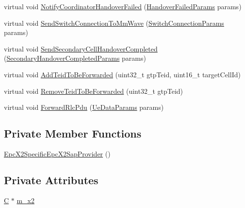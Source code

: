\begin{DoxyCompactItemize}
\item 
virtual void \hyperlink{classns3_1_1EpcX2SpecificEpcX2SapProvider_a8a75fce81f1207ec1c2d5b635e46215f}{Notify\+Coordinator\+Handover\+Failed} (\hyperlink{structns3_1_1EpcX2Sap_1_1HandoverFailedParams}{Handover\+Failed\+Params} params)
\item 
virtual void \hyperlink{classns3_1_1EpcX2SpecificEpcX2SapProvider_a4683ffd184c6dba1dc7fd2a569949380}{Send\+Switch\+Connection\+To\+Mm\+Wave} (\hyperlink{structns3_1_1EpcX2Sap_1_1SwitchConnectionParams}{Switch\+Connection\+Params} params)
\item 
virtual void \hyperlink{classns3_1_1EpcX2SpecificEpcX2SapProvider_af1b1a3d3956bb801d3739a038ce72808}{Send\+Secondary\+Cell\+Handover\+Completed} (\hyperlink{structns3_1_1EpcX2Sap_1_1SecondaryHandoverCompletedParams}{Secondary\+Handover\+Completed\+Params} params)
\item 
virtual void \hyperlink{classns3_1_1EpcX2SpecificEpcX2SapProvider_aa198a2f4b85a37e6fd8cab04d80ed75a}{Add\+Teid\+To\+Be\+Forwarded} (uint32\+\_\+t gtp\+Teid, uint16\+\_\+t target\+Cell\+Id)
\item 
virtual void \hyperlink{classns3_1_1EpcX2SpecificEpcX2SapProvider_a99a850bb0e7ef9df7ccfa757621ba77e}{Remove\+Teid\+To\+Be\+Forwarded} (uint32\+\_\+t gtp\+Teid)
\item 
virtual void \hyperlink{classns3_1_1EpcX2SpecificEpcX2SapProvider_a06c749ab5201e30f839f32014ae3e936}{Forward\+Rlc\+Pdu} (\hyperlink{structns3_1_1EpcX2Sap_1_1UeDataParams}{Ue\+Data\+Params} params)
\end{DoxyCompactItemize}
\subsection*{Private Member Functions}
\begin{DoxyCompactItemize}
\item 
\hyperlink{classns3_1_1EpcX2SpecificEpcX2SapProvider_a6a13ad96b39b151b4a13367c4db44463}{Epc\+X2\+Specific\+Epc\+X2\+Sap\+Provider} ()
\end{DoxyCompactItemize}
\subsection*{Private Attributes}
\begin{DoxyCompactItemize}
\item 
\hyperlink{loss__COST231__small__cities__urban_8m_aaa53ca0b650dfd85c4f59fa156f7a2cc}{C} $\ast$ \hyperlink{classns3_1_1EpcX2SpecificEpcX2SapProvider_a25cbf054db0fe2eb9920a449cc1b49b2}{m\+\_\+x2}
\end{DoxyCompactItemize}
